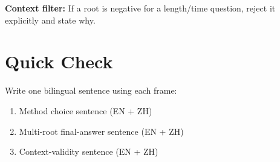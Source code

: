 \documentclass[11pt,a4paper]{article}
\begin{document}
\begin{commonmistakebox}
\textbf{Context filter:} If a root is negative for a length/time question, reject it explicitly and state why.
\end{commonmistakebox}

\section{Quick Check}
Write one bilingual sentence using each frame:
\begin{enumerate}[leftmargin=1.3em]
  \item Method choice sentence (EN + ZH)
  \item Multi-root final-answer sentence (EN + ZH)
  \item Context-validity sentence (EN + ZH)
\end{enumerate}
\end{document}
